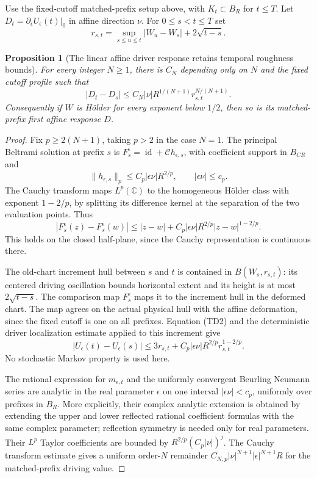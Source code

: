 \documentclass[11pt]{article}
\newtheorem{proposition}[theorem]{Proposition}
\theoremstyle{definition}\newtheorem{definition}[theorem]{Definition}
\theoremstyle{remark}\newtheorem{remark}[theorem]{Remark}
\begin{document}
Use the fixed-cutoff matched-prefix setup above, with $K_t\subset B_R$
for $t\le T$. Let $D_t=\partial_\epsilon U_\epsilon(t)|_0$ in affine
direction $\nu$. For $0\le s<t\le T$ set
\[
 r_{s,t}=\sup_{s\le u\le t}|W_u-W_s|+2\sqrt{t-s}.
\]
\begin{proposition}[The linear affine driver response retains temporal roughness bounds]
\label{prop:temporal-affine-response}
For every integer $N\ge1$, there is $C_N$ depending only on $N$ and the
fixed cutoff profile such that
\[
 |D_t-D_s|\le C_N|\nu|R^{1/(N+1)}r_{s,t}^{N/(N+1)}.
 \tag{TD1}
\]
Consequently if $W$ is H\"older for every exponent below $1/2$, then so is
its matched-prefix first affine response $D$.
\end{proposition}

\begin{proof}
Fix $p\ge2(N+1)$, taking $p>2$ in the case $N=1$. The principal Beltrami
solution at prefix $s$ is $F_s^\epsilon=\operatorname{id}+\mathcal Ch_{\epsilon,s}$,
with coefficient support in $B_{CR}$ and
\[
 \|h_{\epsilon,s}\|_p\le C_p|\epsilon\nu|R^{2/p},
 \qquad |\epsilon\nu|\le c_p.
\]
The Cauchy transform maps $L^p(\mathbb C)$ to the homogeneous H\"older
class with exponent $1-2/p$, by splitting its difference kernel at the
separation of the two evaluation points. Thus
\[
 |F_s^\epsilon(z)-F_s^\epsilon(w)|
 \le |z-w|+C_p|\epsilon\nu|R^{2/p}|z-w|^{1-2/p}.
 \tag{TD2}
\]
This holds on the closed half-plane, since the Cauchy representation is
continuous there.

The old-chart increment hull between $s$ and $t$ is contained in
$B(W_s,r_{s,t})$: its centered driving oscillation bounds horizontal
extent and its height is at most $2\sqrt{t-s}$. The comparison map
$F_s^\epsilon$ maps it to the increment hull in the deformed chart.
The map agrees on the actual physical hull with the affine deformation,
since the fixed cutoff is one on all prefixes. Equation (TD2) and the
deterministic driver localization estimate applied to this increment give
\[
 |U_\epsilon(t)-U_\epsilon(s)|
 \le3r_{s,t}+C_p|\epsilon\nu|R^{2/p}r_{s,t}^{1-2/p}.
 \tag{TD3}
\]
No stochastic Markov property is used here.

The rational expression for $m_{\epsilon,t}$ and the uniformly convergent
Beurling Neumann series are analytic in the real parameter $\epsilon$
on one interval $|\epsilon\nu|<c_p$, uniformly over prefixes in $B_R$.
More explicitly, their complex analytic extension is obtained by
extending the upper and lower reflected rational coefficient formulas
with the same complex parameter; reflection symmetry is needed only
for real parameters. Their $L^p$ Taylor coefficients are bounded by
$R^{2/p}(C_p|\nu|)^j$. The Cauchy transform estimate gives a uniform
order-$N$ remainder $C_{N,p}|\nu|^{N+1}|\epsilon|^{N+1}R$ for the
matched-prefix driving value.


\end{proof}
\end{document}
